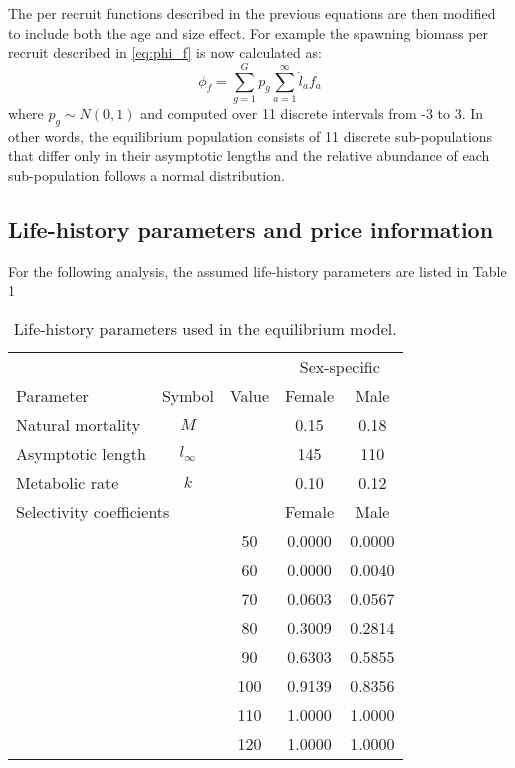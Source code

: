 The per recruit functions described in the previous equations are then modified to include both the age and size effect.  For example the spawning biomass per recruit described in \eqref{eq:phi_f} is now calculated as:
\begin{equation}
	\phi_{f} =\sum_{g=1}^G p_g \sum_{a=1}^\infty \acute{l}_a f_a\label{eq:phi_fg}
\end{equation}
where $p_g \sim N(0,1)$ and computed over 11 discrete intervals from -3 to 3.  In other words, the equilibrium population consists of 11 discrete sub-populations that differ only in their asymptotic lengths and the relative abundance of each sub-population follows a normal distribution.

\subsection*{Life-history parameters and price information} %
\label{sub:life_history_parameters_and_price_information}
For the following analysis, the assumed life-history parameters are listed in Table 1

\begin{table}
	\caption{Life-history parameters used in the equilibrium model.}
	\label{table:Life_history_pars}
	\begin{center}
	\begin{tabular}{lcccc}
		\hline
		 &  & & \multicolumn{2}{c}{Sex-specific}\\
		Parameter         & Symbol     & Value & Female & Male \\
		\hline
		Natural mortality & $M$        &       &   0.15 & 0.18 \\
		Asymptotic length & $l_\infty$ &       &   145  & 110  \\
		Metabolic rate    & $k$        &       &   0.10 & 0.12 \\
		\hline
		
		\multicolumn{3}{l}{Selectivity coefficients}
		 Size (cm) & Female & Male\\
		\hline
		&&  50 & 0.0000& 0.0000\\
		&&  60 & 0.0000& 0.0040\\
		&&  70 & 0.0603& 0.0567\\
		&&  80 & 0.3009& 0.2814\\
		&&  90 & 0.6303& 0.5855\\
		&& 100 & 0.9139& 0.8356\\
		&& 110 & 1.0000& 1.0000\\
		&& 120 & 1.0000& 1.0000\\
		\hline
	\end{tabular}
	\end{center}
\end{table}


